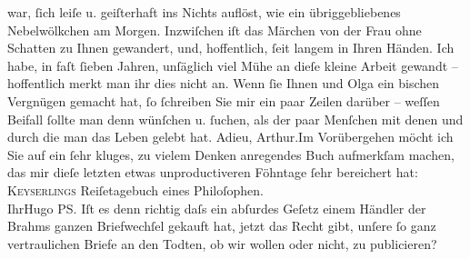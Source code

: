 \begin{ledgroupsized}[t]{13cm}
               war, ſich leiſe u. geiſterhaft ins Nichts auflöst, wie {\pb}ein übriggebliebenes Nebelwölkchen
               am Morgen.\pend
           \pstart
           Inzwiſchen iſt das Märchen von der Frau ohne
                  Schatten zu Ihnen gewandert, und, hoffentlich, ſeit langem in Ihren
               Händen.\pend
           \pstart
           Ich habe, in faſt ſieben Jahren, unſäglich viel Mühe an dieſe kleine Arbeit gewandt –
               hoffentlich merkt man ihr dies nicht an. Wenn ſie Ihnen und Olga ein bischen Vergnügen gemacht hat, ſo ſchreiben Sie mir
               ein paar Zeilen darüber – weſſen Beifall ſollte man denn wünſchen u. ſuchen, als der
               paar Menſchen mit {\pb}denen und durch
               die man das Leben gelebt hat.\pend
           \pstart
           Adieu, Arthur.\hspace*{1.5em}Im Vorübergehen möcht ich Sie auf ein
               ſehr kluges, zu vielem Denken anregendes Buch aufmerkſam machen, das mir dieſe
               letzten etwas unproductiveren Föhntage ſehr bereichert hat: \textsc{Keyserlings}{ }Reiſetagebuch eines
                  Philoſophen.{\\}Ihr\spacefill\mbox{Hugo}\pend
           \pstart
           \noindent{}PS. Iſt es denn richtig daſs ein abſurdes Geſetz einem Händler der Brahms ganzen Briefwechſel gekauft hat, jetzt das Recht gibt, unſere ſo
                  ganz vertraulichen Briefe an den Todten, ob wir wollen oder nicht, zu publicieren?
               \pend
           \endnumbering{}\end{ledgroupsized}  \newcommand{\dateiname}{L02331}\newcommand{\titel}{Hugo Hofmannsthal an Arthur Schnitzler, 2. 11. 1919}\newcommand{\editorInnen}{Martin Anton Müller und Gerd-Hermann Susen}
            \footnotesize
\begin{ledgroupsized}[t]{11.5cm}
\end{ledgroupsized}
         
      